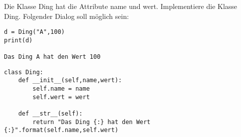 \question[4]
Die Klasse Ding hat die Attribute name und wert. Implementiere die Klasse
Ding. Folgender Dialog soll möglich sein:

\begin{lstlisting}
d = Ding("A",100)
print(d)

Das Ding A hat den Wert 100
\end{lstlisting}

\begin{solutionbox}{5cm}
\begin{lstlisting}
class Ding:
    def __init__(self,name,wert):
        self.name = name
        self.wert = wert

    def __str__(self):
        return "Das Ding {:} hat den Wert {:}".format(self.name,self.wert)
\end{lstlisting}
\end{solutionbox}
